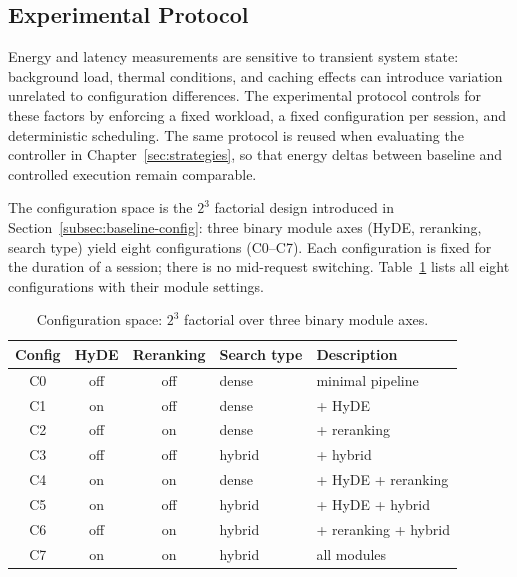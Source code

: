 \subsection{Experimental Protocol}
\label{subsec:protocol}


Energy and latency measurements are sensitive to transient system state:
background load, thermal conditions, and caching effects can introduce
variation unrelated to configuration differences. The experimental protocol
controls for these factors by enforcing a fixed workload, a fixed
configuration per session, and deterministic scheduling. The same protocol is
reused when evaluating the controller in Chapter~\ref{sec:strategies}, so that
energy deltas between baseline and controlled execution remain comparable.


The configuration space is the $2^3$ factorial design introduced in
Section~\ref{subsec:baseline-config}: three binary module axes (HyDE,
reranking, search type) yield eight configurations (C0--C7). Each
configuration is fixed for the duration of a session; there is no mid-request
switching. Table~\ref{tab:configs} lists all eight configurations with their
module settings.

\begin{table}[h!]
\centering
\begin{tabular}{c c c l l}
\hline
\textbf{Config} & \textbf{HyDE} & \textbf{Reranking} & \textbf{Search type} & \textbf{Description} \\
\hline
C0 & off & off & dense  & minimal pipeline \\
C1 & on  & off & dense  & + HyDE  \\
C2 & off & on  & dense  & + reranking \\
C3 & off & off & hybrid & + hybrid \\
C4 & on  & on  & dense  & + HyDE + reranking \\
C5 & on  & off & hybrid & + HyDE + hybrid \\
C6 & off & on  & hybrid & + reranking + hybrid \\
C7 & on  & on  & hybrid & all modules \\
\hline
\end{tabular}
\caption{Configuration space: $2^3$ factorial over three binary module axes.}
\label{tab:configs}
\end{table}

